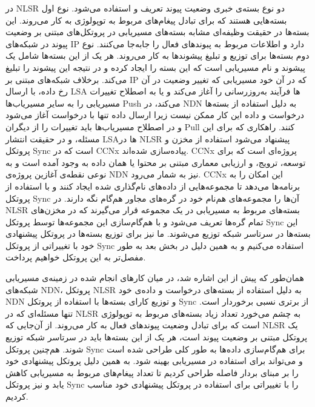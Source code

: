  در NLSR دو نوع بسته‌ی خبری وضعیت پیوند تعریف و استفاده می‌شود. نوع اول بسته‌هایی هستند که برای تبادل پیغام‌های مربوط به توپولوژی به کار می‌روند. این بسته‌ها در حقیقت وظیفه‌ای مشابه بسته‌های مسیریابی در پروتکل‌های مبتنی بر وضعیت پیوند در شبکه‌های IP دارد و اطلاعات مربوط به پبوند‌های فعال را جابه‌جا می‌کنند. نوع دوم بسته‌ها برای توزیع و تبلیغ پیشوند‌ها به کار می‌روند. هر یک از این بسته‌ها شامل یک پیشوند و نام مسیریابی است که این بسته را ایجاد کرده و در نتیجه این پیشوند را تبلیغ می‌کند. برخلاف شبکه‌های مبتنی بر IP که در آن خود مسیریابی که تغییر وضعیت در آن رخ داده، با ارسال LSA ها فرآیند به‌روزرسانی را آغاز می‌کند و یا به اصطلاح تغییرات مسیریابی را به سایر مسیریاب‌ها Push می‌کند، در NDN به دلیل استفاده از بسته‌ها درخواست و داده این کار ممکن نیست زیرا ارسال داده‌ تنها با درخواست آغاز می‌شود و در اصطلاح مسیریاب‌ها باید تغییرات را از دیگران Pull کنند. راهکاری که برای این مسئله، و در حقیقت انتشار LSAها در NLSR پیشنهاد می‌شود استفاده از مخزن  و پروتکل Sync است که در CCNx پیاده‌سازی شده‌اند. CCNx پروژه‌ای است که برای توسعه، ترویج، و ارزیابی معماری مبتنی بر محتوا یا همان داده به وجود آمده است و به نوعی نقطه‌ی آغازین پروژه‌ی NDN نیز به شمار می‌رود. CCNx این امکان را به برنامه‌ها می‌دهد تا مجموعه‌هایی از داده‌های نام‌گذاری شده ایجاد کنند و با استفاده از پروتکل Sync آن‌ها را مجموعه‌های هم‌نام خود در گره‌های مجاور هم‌گام نگه دارند. در NLSR بسته‌های مربوط به مسیریابی در یک مجموعه قرار می‌گیرند که در مخزن‌های تمام گره‌ها تعریف می‌شود و با هم‌گام‌سازی این مجموعه‌ها توسط پروتکل Sync این بسته‌ها در سرتاسر شبکه توزیع می‌شوند. ما نیز برای توزیع بسته‌ها در پروتکل پیشنهادی خود با تغییراتی از پروتکل Sync استفاده می‌کنیم و به همین دلیل در بخش بعد به طور مفصل‌تر به این پروتکل خواهیم پرداخت.

همان‌طور که پیش از این اشاره شد، در میان کارهای انجام شده در زمینه‌ی مسیریابی شبکه‌های NDN، پروتکل NLSR به دلیل استفاده از بسته‌های درخواست و داده‌ی خود NDN و توزیع کارای بسته‌ها با استفاده از پروتکل Sync از برتری نسبی برخوردار است. تنها مسئله‌ای که در NLSR به چشم می‌خورد تعداد زیاد بسته‌های مربوط به توپولوژی است که برای تبادل وضعیت پیوندهای فعال به کار می‌روند. از آن‌جایی که NLSR یک پروتکل مبتنی بر وضعیت پیوند است، هر یک از این بسته‌ها باید در سرتاسر شبکه توزیع شوند. هم‌چنین پروتکل Sync برای هم‌گام‌سازی داده‌ها به طور کلی طراحی شده است و می‌تواند برای استفاده در مسیریابی بهینه شود. به همین دلیل پروتکل پیشنهادی خود را بر مبنای بردار فاصله طراحی کردیم تا تعداد پیغام‌های مربوط به مسیریابی کاهش یابد و نیز پروتکل Sync  را با تغییراتی برای استفاده در پروتکل پیشنهادی خود مناسب کردیم. 




